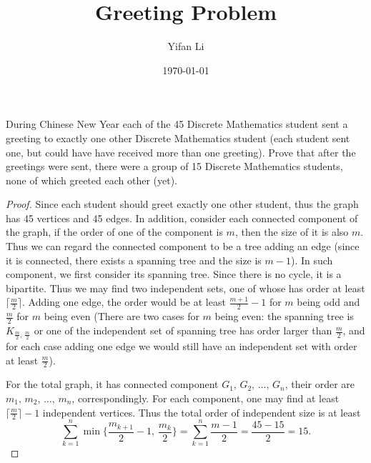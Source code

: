 \documentclass{article}
\title{\vspace{-2cm} Greeting Problem}
\author{Yifan Li}
\date{\today}
\begin{document}
\maketitle

During Chinese New Year each of the 45 Discrete Mathematics student sent a greeting to
exactly one other Discrete Mathematics student (each student sent one, but could have have
received more than one greeting). Prove that after the greetings were sent, there were a group
of 15 Discrete Mathematics students, none of which greeted each other (yet).

\begin{proof}
    Since each student should greet exactly one other student, thus the graph has 45 vertices and 45 edges. In addition, consider each connected component of the graph, if the order of one of the component is $m$, then the size of it is also $m$. Thus we can regard the connected component to be a tree adding an edge (since it is connected, there exists a spanning tree and the size is $m-1$). In such component, we first consider its spanning tree. Since there is no cycle, it is a bipartite. Thus we may find two independent sets, one of whose has order at least $\lceil\frac{m}{2}\rceil$. Adding one edge, the order would be at least $\frac{m+1}{2}-1$ for $m$ being odd and $\frac{m}{2}$ for $m$ being even (There are two cases for $m$ being even: the spanning tree is $K_{\frac{m}{2},\,\frac{m}{2}}$ or one of the independent set of spanning tree has order larger than $\frac{m}{2}$, and for each case adding one edge we would still have an independent set with order at least $\frac{m}{2}$).

    For the total graph, it has connected component $G_1,\,G_2,\,\ldots,\,G_n$, their order are $m_1,\,m_2,\,\ldots,\,m_n$, correspondingly. For each component, one may find at least $\lceil\frac{m}{2}\rceil-1$ independent vertices. Thus the total order of independent size is at least 
    \begin{equation*}
        \sum_{k=1}^{n}{\min\{\frac{m_{k+1}}{2}-1,\,\frac{m_k}{2}\}}=\sum_{k=1}^{n}{\frac{m-1}{2}}=\frac{45-15}{2}=15.
    \end{equation*}
\end{proof}
\end{document}
